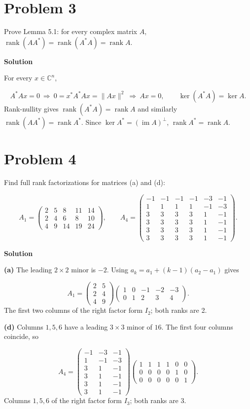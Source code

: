 \documentclass[UTF8,10pt,letterpaper,fontset=fandol]{ctexart}
\newcommand{\C}{\mathbb C}
\DeclareMathOperator{\rank}{rank}
\DeclareMathOperator{\im}{im}
\begin{document}
\section{Problem 3}
Prove Lemma 5.1: for every complex matrix $A$, $\rank(AA^*)=\rank(A^*A)=\rank A$.\par
\par{}\textbf{Solution}\par
For every $x\in\C^n$,\par
\[
 A^*Ax=0\ \Longrightarrow\ 0=x^*A^*Ax=\|Ax\|^2
 \ \Longrightarrow\ Ax=0,\qquad \ker(A^*A)=\ker A.
\]
Rank-nullity gives $\rank(A^*A)=\rank A$ and similarly $\rank(AA^*)=\rank A^*$. Since $\ker A^*=(\im A)^\perp$, $\rank A^*=\rank A$.\par
\section{Problem 4}
Find full rank factorizations for matrices (a) and (d):\par
\[
 A_1=\begin{pmatrix}2&5&8&11&14\\2&4&6&8&10\\4&9&14&19&24\end{pmatrix},\qquad
 A_4=\begin{pmatrix}-1&-1&-1&-1&-3&-1\\1&1&1&1&-1&-3\\3&3&3&3&1&-1\\3&3&3&3&1&-1\\3&3&3&3&1&-1\\3&3&3&3&1&-1\end{pmatrix}.
\]
\par{}\textbf{Solution}\par
\textbf{(a)} The leading $2\times2$ minor is $-2$. Using $a_k=a_1+(k-1)(a_2-a_1)$ gives\par
\[
 \boxed{A_1=\begin{pmatrix}2&5\\2&4\\4&9\end{pmatrix}
 \begin{pmatrix}1&0&-1&-2&-3\\0&1&2&3&4\end{pmatrix}} .
\]
The first two columns of the right factor form $I_2$; both ranks are 2.\par
\textbf{(d)} Columns $1,5,6$ have a leading $3\times3$ minor of $16$. The first four columns coincide, so\par
\[
 \boxed{A_4=
 \begin{pmatrix}-1&-3&-1\\1&-1&-3\\3&1&-1\\3&1&-1\\3&1&-1\\3&1&-1\end{pmatrix}
 \begin{pmatrix}1&1&1&1&0&0\\0&0&0&0&1&0\\0&0&0&0&0&1\end{pmatrix}} .
\]
Columns $1,5,6$ of the right factor form $I_3$; both ranks are 3.\par
\end{document}
